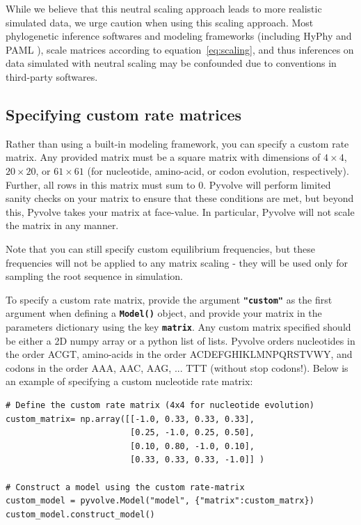 \documentclass{article}
\newcommand{\code}[1]{\textbf{\texttt{\small{#1}}}}
\begin{document}
While we believe that this neutral scaling approach leads to more realistic simulated data, we urge caution when using this scaling approach. Most phylogenetic inference softwares and modeling frameworks (including HyPhy \citep{HYPHY} and PAML \citep{PAML}), scale matrices according to equation~\ref{eq:scaling}, and thus inferences on data simulated with neutral scaling may be confounded due to conventions in third-party softwares.


\subsection{Specifying custom rate matrices}\label{sec:custom}

Rather than using a built-in modeling framework, you can specify a custom rate matrix. Any provided matrix must be a square matrix with dimensions of $4\times4$, $20\times20$, or $61\times61$ (for nucleotide, amino-acid, or codon evolution, respectively). Further, all rows in this matrix must sum to 0. Pyvolve will perform limited sanity checks on your matrix to ensure that these conditions are met, but beyond this, Pyvolve takes your matrix at face-value. In particular, Pyvolve will not scale the matrix in any manner.

Note that you can still specify custom equilibrium frequencies, but these frequencies will not be applied to any matrix scaling - they will be used only for sampling the root sequence in simulation.

To specify a custom rate matrix, provide the argument \code{"custom"} as the first argument when defining a \code{Model()} object, and provide your matrix in the parameters dictionary using the key \code{matrix}. 
Any custom matrix specified should be either a 2D numpy array or a python list of lists. Pyvolve orders nucleotides in the order ACGT, amino-acids in the order ACDEFGHIKLMNPQRSTVWY, and codons in the order AAA, AAC, AAG, ... TTT (without stop codons!). Below is an example of specifying a custom nucleotide rate matrix:
\begin{lstlisting}
# Define the custom rate matrix (4x4 for nucleotide evolution)
custom_matrix= np.array([[-1.0, 0.33, 0.33, 0.33], 
                         [0.25, -1.0, 0.25, 0.50], 
                         [0.10, 0.80, -1.0, 0.10],
                         [0.33, 0.33, 0.33, -1.0]] )

# Construct a model using the custom rate-matrix
custom_model = pyvolve.Model("model", {"matrix":custom_matrx})
custom_model.construct_model()
\end{lstlisting}
\end{document}

